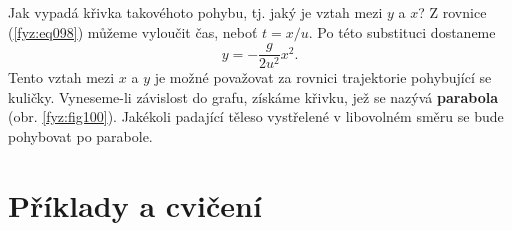     Jak vypadá křivka takovéhoto pohybu, tj. jaký je vztah mezi \(y\) a \(x\)? Z rovnice 
    (\ref{fyz:eq098}) můžeme vyloučit čas, neboť \(t= x/u\). Po této substituci dostaneme
    \begin{equation}\label{fyz:eq099}
      y = -\frac{g}{2u^2}x^2.
    \end{equation}
    Tento vztah mezi \(x\) a \(y\) je možné považovat za rovnici trajektorie pohybující se kuličky. 
    Vyneseme-li závislost do grafu, získáme křivku, jež se nazývá \textbf{parabola} (obr. 
    \ref{fyz:fig100}). Jakékoli padající těleso vystřelené v libovolném směru se bude pohybovat po 
    parabole. 
  
  \section{Příklady a cvičení}
      

